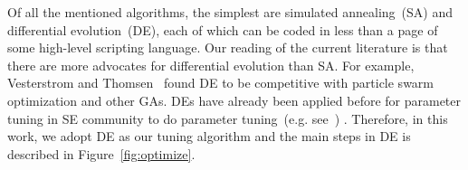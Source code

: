 \documentclass[sigconf]{acmart}
\theoremstyle{break}
\newcommand{\fig}[1]{Figure~\ref{fig:#1}}
\begin{document}
Of all the mentioned algorithms,  the simplest are simulated annealing~(SA)  and 
differential evolution~(DE), each of which can be coded in less than a page of some high-level scripting language.
 Our reading of the current literature is that there are more  advocates for
differential evolution than SA. For example,  Vesterstrom and Thomsen~\cite{Vesterstrom04} found DE to be competitive with 
 particle swarm optimization and other GAs.  DEs have already been applied before for 
 parameter tuning in SE community to do parameter tuning~(e.g. see~\cite{omran2005differential, chiha2012tuning, fu2016tuning, fu2016differential, agrawal2016wrong}) .
Therefore, in this work, we adopt DE as our tuning algorithm and 
the main steps in DE is described in \fig{optimize}.

\end{document}
